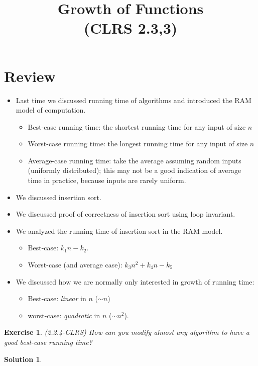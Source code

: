 \documentclass[11pt]{article}
\newtheorem{exercise}{Exercise}
\newtheorem{solution}{Solution}
\begin{document}
\title{{\bf Growth of Functions}\\
\normalsize{(CLRS 2.3,3)}}
\date{}
\maketitle



\section{Review}

\begin{itemize}
\item Last time we discussed running time of algorithms and introduced the RAM model of computation. 
     \begin{itemize}    
     \item Best-case running time: the shortest running time for any input of size $n$
     \item Worst-case running time:  the longest running time for any input of size $n$
     \item Average-case running time: take the average assuming random
       inputs (uniformly distributed); this may not be a good
       indication of average time in practice, because inputs are
       rarely uniform.
     \end{itemize}
\item We discussed insertion sort.
\item We discussed proof of correctness of insertion sort using loop
invariant.
\item We analyzed the running time of insertion sort in the RAM model.
     \begin{itemize}
     \item Best-case: $k_1n-k_2$.
     \item Worst-case (and average case): $k_3n^2+k_4 n -k_5$
     \end{itemize}
\item We discussed how we are normally only interested in growth of
     running time: 
  \begin{itemize} 
  \item Best-case: \emph{linear} in $n$ ($\sim n$)
  \item worst-case: \emph{quadratic} in $n$ ($\sim n^2$).
  \end{itemize}
\end{itemize}

\begin{exercise} (2.2.4-CLRS) How can you modify almost any algorithm
to have a good best-case running time?
\end{exercise}
\begin{solution}
\end{solution}
\end{document}
